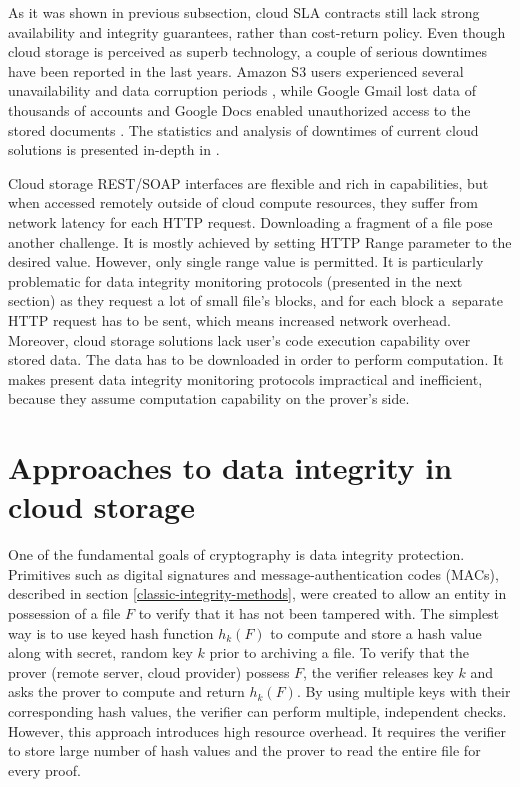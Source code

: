 As it was shown in previous subsection, cloud SLA contracts still lack strong
availability and integrity guarantees, rather than cost-return policy. Even
though cloud storage is perceived as superb technology, a couple of serious
downtimes have been reported in the last years. Amazon S3 users experienced
several unavailability and data corruption periods
\cite{amazon-downtime1,amazon-downtime2},
while Google Gmail lost data of thousands of accounts 
\cite{gmail-downtime} and
Google Docs enabled unauthorized access to the stored documents 
\cite{docs-downtime}. The statistics and analysis of downtimes of current cloud
solutions is presented in-depth in \cite{cloud-downtime-stats}.

Cloud storage REST/SOAP interfaces are flexible and rich in capabilities, but
when accessed remotely outside of cloud compute resources, they suffer from
network latency for each HTTP request. Downloading a fragment of a file pose
another challenge. It is mostly achieved by setting HTTP Range parameter to the
desired value. However, only single range value is permitted. It is particularly
problematic for data integrity monitoring protocols (presented in the next
section) as they request a lot of small file's blocks, and for each block 
a~separate HTTP request has to be sent, which means increased network
overhead.\\

Moreover, cloud storage solutions lack user's code execution capability over
stored data. The data has to be downloaded in order to perform computation. It
makes present data integrity monitoring protocols impractical and inefficient,
because they assume computation capability on the prover's side.

\section{Approaches to data integrity in cloud storage}
\label{cloud-integrity-approaches}
One of the fundamental goals of cryptography is data integrity protection.
Primitives such as digital signatures and message-authentication codes (MACs),
described in section \ref{classic-integrity-methods}, were created to allow
an entity in possession of a file $F$ to verify that it has not been tampered
with. The simplest way is to use keyed hash function $h_{k}(F)$ to compute and
store a hash value along with secret, random key $k$ prior to archiving a file.
To verify that the prover (remote server, cloud provider) possess $F$, the
verifier releases key $k$ and asks the prover to compute and return $h_{k}(F)$.
By using multiple keys with their corresponding hash values, the verifier can
perform multiple, independent checks. However, this approach introduces high
resource overhead. It requires the verifier to store large number
of hash values and the prover to read the entire file for every proof.\\

